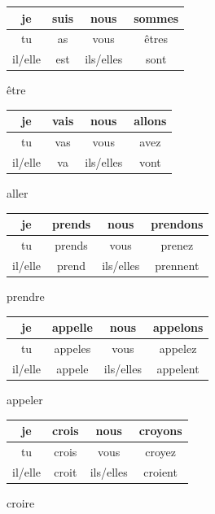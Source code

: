 \documentclass{article}[20pt]{}
\begin{document}
\begin{figure}[ht]
	\centering
	\begin{tabular}{|cc|cc|}\hline
	je & suis & nous  & sommes \\ \hline
	tu & as & vous & \^{e}tres \\ \hline
	il/elle & est &ils/elles & sont \\ \hline 
	\end{tabular}
	\caption{\^{e}tre}
\end{figure}
\begin{figure}[ht]
\centering
	
\end{figure}
 \begin{figure}[ht]
	\centering
	\begin{tabular}{|cc|cc|}\hline
		je & vais &nous & allons \\ \hline
		tu & vas &vous &avez \\ \hline
		il/elle & va &ils/elles & vont	\\ \hline			
	\end{tabular}
	\caption{aller}	
\end{figure}
\begin{figure}
\centering
	\begin{tabular}{|cc|cc|}\hline
		je & prends & nous & prendons \\ \hline
		tu & prends & vous & prenez \\ \hline 
		il/elle & prend	&ils/elles & prennent \\ \hline
	\end{tabular}
	\caption{prendre}
\end{figure} 
\begin{figure}[ht]
	\centering
	\begin{tabular}{|cc|cc|}\hline
		je & appelle &nous & appelons \\ \hline
		tu & appeles &vous &appelez \\ \hline
		il/elle & appele &ils/elles & appelent	\\ \hline			
	\end{tabular}
	\caption{appeler}	
\end{figure}	
\begin{figure}[ht]
\centering
	\begin{tabular}{|cc|cc|}\hline
		je & crois & nous & croyons \\ \hline
		tu & crois & vous & croyez \\ \hline 
		il/elle & croit	&ils/elles & croient \\ \hline
	\end{tabular}
	\caption{croire}
\end{figure}
\end{document}
